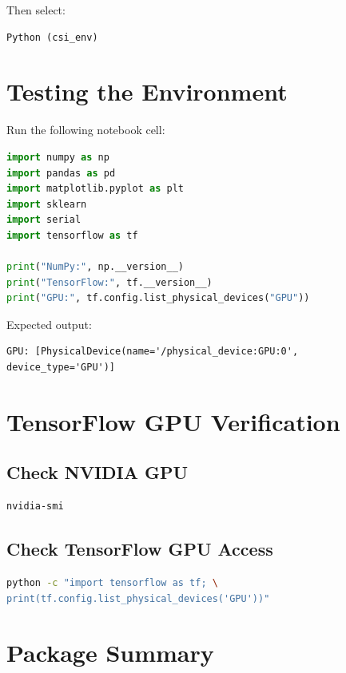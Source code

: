 \documentclass[12pt,a4paper]{article}
\begin{document}
Then select:

\begin{verbatim}
Python (csi_env)
\end{verbatim}

\section{Testing the Environment}

Run the following notebook cell:

\begin{lstlisting}[language=Python]
import numpy as np
import pandas as pd
import matplotlib.pyplot as plt
import sklearn
import serial
import tensorflow as tf

print("NumPy:", np.__version__)
print("TensorFlow:", tf.__version__)
print("GPU:", tf.config.list_physical_devices("GPU"))
\end{lstlisting}

Expected output:

\begin{verbatim}
GPU: [PhysicalDevice(name='/physical_device:GPU:0',
device_type='GPU')]
\end{verbatim}

\section{TensorFlow GPU Verification}

\subsection{Check NVIDIA GPU}

\begin{lstlisting}[language=bash]
nvidia-smi
\end{lstlisting}

\subsection{Check TensorFlow GPU Access}

\begin{lstlisting}[language=bash]
python -c "import tensorflow as tf; \
print(tf.config.list_physical_devices('GPU'))"
\end{lstlisting}

\section{Package Summary}
\end{document}
